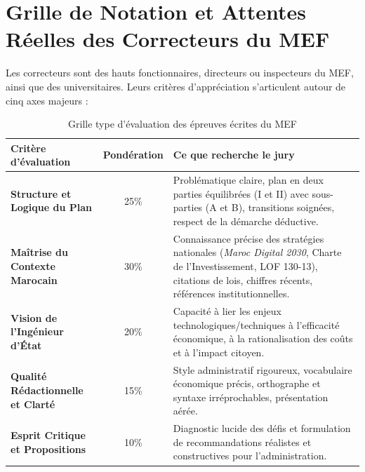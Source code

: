 \section{Grille de Notation et Attentes Réelles des Correcteurs du MEF}
Les correcteurs sont des hauts fonctionnaires, directeurs ou inspecteurs du MEF, ainsi que des universitaires. Leurs critères d'appréciation s'articulent autour de cinq axes majeurs :
\begin{table}[H]
\centering
\small
\begin{tabular}{|p{4.5cm}|c|p{8.5cm}|}
\hline
\rowcolor{gray!20} \textbf{Critère d'évaluation} & \textbf{Pondération} & \textbf{Ce que recherche le jury} \\ \hline
\textbf{Structure et Logique du Plan} & 25\% & Problématique claire, plan en deux parties équilibrées (I et II) avec sous-parties (A et B), transitions soignées, respect de la démarche déductive. \\ \hline
\textbf{Maîtrise du Contexte Marocain} & 30\% & Connaissance précise des stratégies nationales (\textit{Maroc Digital 2030}, Charte de l'Investissement, LOF 130-13), citations de lois, chiffres récents, références institutionnelles. \\ \hline
\textbf{Vision de l'Ingénieur d'État} & 20\% & Capacité à lier les enjeux technologiques/techniques à l'efficacité économique, à la rationalisation des coûts et à l'impact citoyen. \\ \hline
\textbf{Qualité Rédactionnelle et Clarté} & 15\% & Style administratif rigoureux, vocabulaire économique précis, orthographe et syntaxe irréprochables, présentation aérée. \\ \hline
\textbf{Esprit Critique et Propositions} & 10\% & Diagnostic lucide des défis et formulation de recommandations réalistes et constructives pour l'administration. \\ \hline
\end{tabular}
\caption{Grille type d'évaluation des épreuves écrites du MEF}
\end{table}

